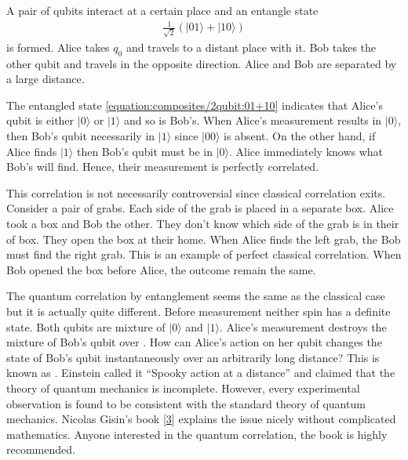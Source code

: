 \documentclass[letterpaper,10pt,english]{jupyterBook}
\begin{document}
\sphinxAtStartPar
A pair of qubits interact at a certain place and an entangle state
\begin{equation}\label{equation:composites/2qubit:01+10}
\begin{split}
\frac{1}{\sqrt{2}} \left(|01\rangle + |10\rangle\right)
\end{split}
\end{equation}
\sphinxAtStartPar
is formed.  Alice takes \(q_0\) and travels to a distant place with it. Bob takes the other qubit and travels in the opposite direction.  Alice and Bob are separated by a large distance.

\sphinxAtStartPar
The entangled state \eqref{equation:composites/2qubit:01+10} indicates that Alice’s qubit is either \(|0\rangle\) or \(|1\rangle\) and so is Bob’s.  When Alice’s measurement results in \(|0\rangle\), then Bob’s qubit necessarily in \(|1\rangle\) since \(|00\rangle\) is absent.  On the other hand, if Alice finds \(|1\rangle\) then Bob’s qubit must be in \(|0\rangle\).   Alice immediately knows what Bob’s will find.  Hence, their measurement is perfectly correlated.

\sphinxAtStartPar
This correlation is not necessarily controversial since classical correlation exits.  Consider a pair of grabs.  Each side of the grab is placed in a separate box.  Alice took a box and Bob the other.  They don’t know which side of the grab is in their of box.  They open the box at their home.  When Alice finds the left grab, the Bob must find the right grab.  This is an example of perfect classical correlation.  When Bob opened the box before Alice, the outcome remain the same.

\sphinxAtStartPar
The quantum correlation by entanglement seems the same as the classical case but it is actually quite different. Before measurement neither spin has a definite state.  Both qubits are mixture of \(|0\rangle\) and \(|1\rangle\).  Alice’s measurement destroys the mixture of Bob’s qubit  over .  How can Alice’s action on her qubit changes the state of Bob’s qubit instantaneously over an arbitrarily long distance?   This is known as .  Einstein called it “Spooky action at a distance” and claimed that the theory of quantum mechanics is incomplete.  However, every experimental observation is found to be consistent with the standard theory of quantum mechanics. Nicolas Gisin’s book {[}\hyperlink{cite.references:id20}{3}{]} explains the issue nicely without complicated mathematics. Anyone interested in the quantum correlation, the book is highly recommended.
\end{document}
